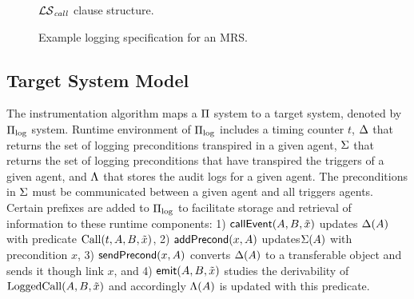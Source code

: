 \begin{figure}
\setlength{\fboxsep}{0pt}%
\caption{${\mathcal{LS}_{\mathit{call}}}$ clause structure.} 
\label{fig:callpols}
\end{figure}


\begin{figure}
\setlength{\fboxsep}{0pt}%
\caption{Example logging specification for an MRS.}
\label{fig:exm-logspec}
\end{figure}

\subsection{Target System Model} \label{sec:pi-log}
The instrumentation algorithm maps a $\Pi$ system to a target system, denoted by $\Pi_{\mathrm{log}}$ system. Runtime environment of $\Pi_{\mathrm{log}}$ includes a timing counter $t$, $\Delta$ that returns the set of logging preconditions transpired in a given agent, $\Sigma$ that returns the set of logging preconditions that have transpired the triggers of a given agent, and $\Lambda$ that stores the audit logs for a given agent. The preconditions in $\Sigma$ must be communicated between a given agent and all triggers agents. Certain prefixes are added to $\Pi_{\mathrm{log}}$ to facilitate storage and retrieval of information to these runtime components: 1) $\mathsf{callEvent}(A,B,\tilde{x})$ updates $\Delta(A)$ with predicate $\mathrm{Call}(t,A,B,\tilde{x})$, 2) $\mathsf{addPrecond}(x,A)$ updates$\Sigma(A)$ with precondition $x$, 3) $\mathsf{sendPrecond}(x,A)$ converts $\Delta(A)$ to a transferable object and sends it though link $x$, and 4) $\mathsf{emit}(A,B,\tilde{x})$ studies the derivability of $\mathrm{LoggedCall}(A,B,\tilde{x})$ and accordingly $\Lambda(A)$ is updated with this predicate. 


